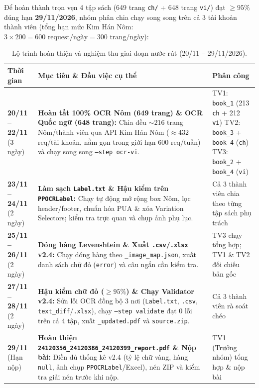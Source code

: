 \documentclass[12pt,a4paper]{article}
\begin{document}
Để hoàn thành trọn vẹn 4 tập sách (649 trang \texttt{ch/} + 648 trang \texttt{vi/}) đạt $\ge 95\%$ đúng hạn \textbf{29/11/2026}, nhóm phân chia chạy song song trên cả 3 tài khoản thành viên (tổng hạn mức Kim Hán Nôm: $3 \times 200 = 600\text{ request/ngày} = 300\text{ trang/ngày}$):

\begin{table}[H]
\centering
\begin{tabularx}{\textwidth}{>{\raggedright\arraybackslash}p{2.9cm} >{\raggedright\arraybackslash}X >{\raggedright\arraybackslash}p{4.6cm}}
\toprule
\textbf{Thời gian} & \textbf{Mục tiêu \& Đầu việc cụ thể} & \textbf{Phân công} \\
\midrule
\textbf{20/11 -- 22/11} (3 ngày) & \textbf{Hoàn tất 100\% OCR Nôm (649 trang) \& OCR Quốc ngữ (648 trang):} Chia đều $\sim 216$ trang Nôm/thành viên qua API Kim Hán Nôm ($\approx 432$ req/tài khoản, nằm gọn trong giới hạn 600 req/tuần) và chạy song song \texttt{--step ocr-vi}. & TV1: \texttt{book\_1} (213 \texttt{ch} + 212 \texttt{vi}) \newline TV2: \texttt{book\_3} + \texttt{book\_4} (\texttt{ch}) \newline TV3: \texttt{book\_2} + \texttt{book\_4} (\texttt{vi}) \\
\midrule
\textbf{23/11 -- 24/11} (2 ngày) & \textbf{Làm sạch \texttt{Label.txt} \& Hậu kiểm trên \texttt{PPOCRLabel}:} Chạy tự động mở rộng box Nôm, lọc header/footer, chuẩn hóa PUA \& xóa Variation Selectors; kiểm tra trực quan và chụp ảnh phụ lục. & Cả 3 thành viên chia theo từng tập sách phụ trách \\
\midrule
\textbf{25/11 -- 26/11} (2 ngày) & \textbf{Dóng hàng Levenshtein \& Xuất \texttt{.csv}/\texttt{.xlsx} v2.4:} Chạy dóng hàng theo \texttt{\_image\_map.json}, xuất danh sách chữ đỏ (\texttt{error}) và câu ngắn cần kiểm tra. & TV3 chạy tổng hợp; TV1 \& TV2 đối chiếu bản gốc \\
\midrule
\textbf{27/11 -- 28/11} (2 ngày) & \textbf{Hậu kiểm chữ đỏ ($\ge 95\%$) \& Chạy Validator v2.4:} Sửa lỗi OCR đồng bộ 3 nơi (\texttt{Label.txt}, \texttt{.csv}, \texttt{text\_diff}/\texttt{.xlsx}), chạy \texttt{--step validate} đạt 0 lỗi trên cả 4 tập, xuất \texttt{\_updated.pdf} và \texttt{source.zip}. & Cả 3 thành viên rà soát chéo \\
\midrule
\textbf{29/11} (Hạn nộp) & \textbf{Hoàn thiện \texttt{24120356\_24120386\_24120399\_report.pdf} \& Nộp bài:} Điền đủ thống kê v2.4 (tỷ lệ chữ vàng, hàng \texttt{null}, ảnh chụp \texttt{PPOCRLabel}/Excel), nén ZIP và kiểm tra giải nén trước khi nộp. & TV1 (Trưởng nhóm) tổng hợp \& nộp bài \\
\bottomrule
\end{tabularx}
\caption{Lộ trình hoàn thiện và nghiệm thu giai đoạn nước rút (20/11 -- 29/11/2026).}
\end{table}
\end{document}
